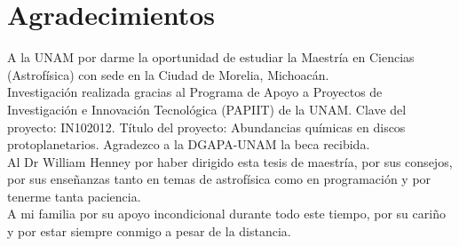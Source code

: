 \documentclass{report}
\begin{document}
\renewcommand{\thepage}{\roman{page}}
\setcounter{page}{1}

\newcommand{\blankpage}{
\newpage
\thispagestyle{empty}
\mbox{}
\newpage
}


\blankpage

\tableofcontents


\pagestyle{fancy}
\fancyhf{}
\fancyfoot[CE,CO]{\leftmark}
\fancyfoot[LE,RO]{\thepage}
\cfoot{} 

\blankpage

 
\newpage
\section*{Agradecimientos}
 
A la UNAM por darme la oportunidad de estudiar la Maestría en Ciencias (Astrofísica) con sede en la Ciudad de Morelia, Michoacán.
\\[0.5cm] 

Investigación realizada gracias al Programa de Apoyo a Proyectos de Investigación e Innovación Tecnológica (PAPIIT) de la UNAM. Clave del proyecto: IN102012. Título del proyecto: Abundancias químicas en discos protoplanetarios. Agradezco a la DGAPA-UNAM la beca recibida.
\\[0.5cm]

Al Dr William Henney por haber dirigido esta tesis de maestría, por sus consejos, por sus enseñanzas tanto en temas de astrofísica como en programación y por tenerme tanta paciencia. 
\\[0.5cm] 

A mi familia por su apoyo incondicional durante todo este tiempo, por su cariño  y por estar siempre conmigo a pesar de la distancia.
\\[0.5cm] 
\end{document}
